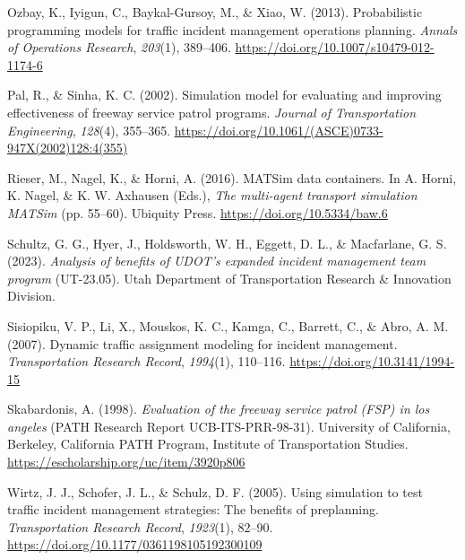 \documentclass[fancy, oneside, mastersfancy, ms]{byuthesis}
\newlength{\cslhangindent}
\newlength{\cslentryspacingunit} %
\newenvironment{CSLReferences}[2] %
 {%
  \setlength{\parindent}{0pt}
  \ifodd #1
  \let\oldpar\par
  \def\par{\hangindent=\cslhangindent\oldpar}
  \fi
  \setlength{\parskip}{#2\cslentryspacingunit}
 }%
 {}
\begin{document}
\begin{CSLReferences}{1}{0}
\leavevmode{}%
Ozbay, K., Iyigun, C., Baykal-Gursoy, M., \& Xiao, W. (2013).
Probabilistic programming models for traffic incident management
operations planning. \emph{Annals of Operations Research},
\emph{203}(1), 389--406. \url{https://doi.org/10.1007/s10479-012-1174-6}

\leavevmode{}%
Pal, R., \& Sinha, K. C. (2002). Simulation model for evaluating and
improving effectiveness of freeway service patrol programs.
\emph{Journal of Transportation Engineering}, \emph{128}(4), 355--365.
\url{https://doi.org/10.1061/(ASCE)0733-947X(2002)128:4(355)}

\leavevmode{}%
Rieser, M., Nagel, K., \& Horni, A. (2016). MATSim data containers. In
A. Horni, K. Nagel, \& K. W. Axhausen (Eds.), \emph{The multi-agent
transport simulation MATSim} (pp. 55--60). Ubiquity Press.
\url{https://doi.org/10.5334/baw.6}

\leavevmode{}%
Schultz, G. G., Hyer, J., Holdsworth, W. H., Eggett, D. L., \&
Macfarlane, G. S. (2023). \emph{Analysis of benefits of UDOT's expanded
incident management team program} (UT-23.05). Utah Department of
Transportation Research \& Innovation Division.

\leavevmode{}%
Sisiopiku, V. P., Li, X., Mouskos, K. C., Kamga, C., Barrett, C., \&
Abro, A. M. (2007). Dynamic traffic assignment modeling for incident
management. \emph{Transportation Research Record}, \emph{1994}(1),
110--116. \url{https://doi.org/10.3141/1994-15}

\leavevmode{}%
Skabardonis, A. (1998). \emph{Evaluation of the freeway service patrol
(FSP) in los angeles} (PATH Research Report UCB-ITS-PRR-98-31).
University of California, Berkeley, California PATH Program, Institute
of Transportation Studies.
\url{https://escholarship.org/uc/item/3920p806}

\leavevmode{}%
Wirtz, J. J., Schofer, J. L., \& Schulz, D. F. (2005). Using simulation
to test traffic incident management strategies: {The} benefits of
preplanning. \emph{Transportation Research Record}, \emph{1923}(1),
82--90. \url{https://doi.org/10.1177/0361198105192300109}

\end{CSLReferences}

\cleardoublepage
{}
{}
\appendix
\end{document}
